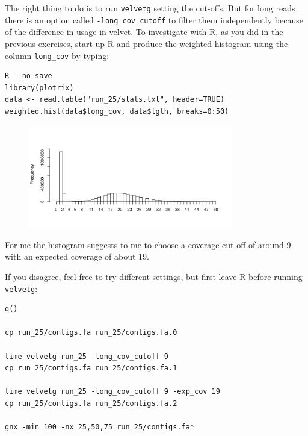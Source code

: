 \begin{steps}
The right thing to do is to run \texttt{velvetg} setting the cut-offs. But for long reads
there is an option called \texttt{-long\_cov\_cutoff} to filter them
independently because of the difference in usage in velvet. To investigate with
R, as you did in the previous exercises, start up R and produce the weighted
histogram using the column \texttt{long\_cov} by typing:
\begin{lstlisting}
R --no-save
library(plotrix) 
data <- read.table("run_25/stats.txt", header=TRUE) 
weighted.hist(data$long_cov, data$lgth, breaks=0:50)
\end{lstlisting}

\begin{figure}[H]
\centering
\includegraphics[width=0.8\textwidth]{de_novo/velvet/velvet_Rplot003.png}
\caption{\label{fig:velvetRplot003}}
\end{figure}

For me the histogram suggests to me to choose a coverage cut-off of around 9
with an expected coverage of about 19.

If you disagree, feel free to try different settings, but first leave R before
running \texttt{velvetg}:
\begin{lstlisting}
q()

cp run_25/contigs.fa run_25/contigs.fa.0

time velvetg run_25 -long_cov_cutoff 9
cp run_25/contigs.fa run_25/contigs.fa.1

time velvetg run_25 -long_cov_cutoff 9 -exp_cov 19
cp run_25/contigs.fa run_25/contigs.fa.2

gnx -min 100 -nx 25,50,75 run_25/contigs.fa*
\end{lstlisting}

\end{steps}


